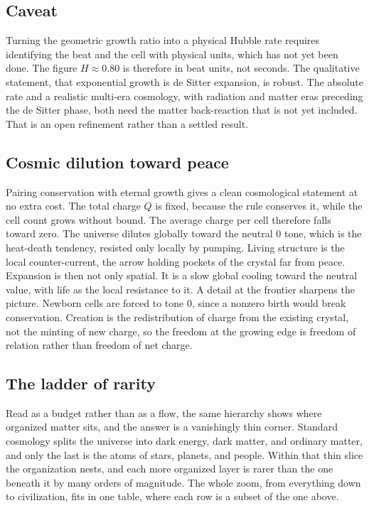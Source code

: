 \subsection{Caveat}

Turning the geometric growth ratio into a physical Hubble rate requires identifying the beat and the cell with physical units, which has not yet been done. The figure $H \approx 0.80$ is therefore in beat units, not seconds. The qualitative statement, that exponential growth is de Sitter expansion, is robust. The absolute rate and a realistic multi-era cosmology, with radiation and matter eras preceding the de Sitter phase, both need the matter back-reaction that is not yet included. That is an open refinement rather than a settled result.

\subsection{Cosmic dilution toward peace}

Pairing conservation with eternal growth gives a clean cosmological statement at no extra cost. The total charge $Q$ is fixed, because the rule conserves it, while the cell count grows without bound. The average charge per cell therefore falls toward zero. The universe dilutes globally toward the neutral $0$ tone, which is the heat-death tendency, resisted only locally by pumping. Living structure is the local counter-current, the arrow holding pockets of the crystal far from peace. Expansion is then not only spatial. It is a slow global cooling toward the neutral value, with life as the local resistance to it. A detail at the frontier sharpens the picture. Newborn cells are forced to tone $0$, since a nonzero birth would break conservation. Creation is the redistribution of charge from the existing crystal, not the minting of new charge, so the freedom at the growing edge is freedom of relation rather than freedom of net charge.

\subsection{The ladder of rarity}

Read as a budget rather than as a flow, the same hierarchy shows where organized matter sits, and the answer is a vanishingly thin corner. Standard cosmology splits the universe into dark energy, dark matter, and ordinary matter, and only the last is the atoms of stars, planets, and people. Within that thin slice the organization nests, and each more organized layer is rarer than the one beneath it by many orders of magnitude. The whole zoom, from everything down to civilization, fits in one table, where each row is a subset of the one above.

